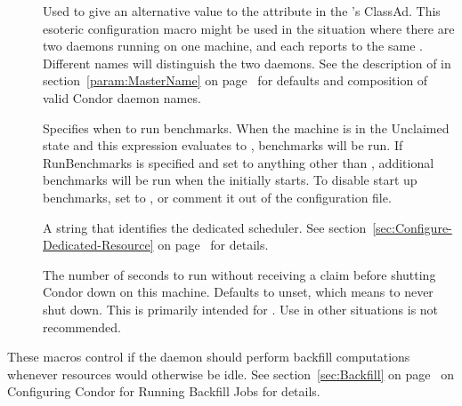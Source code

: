 \begin{description}
\item[] \label{param:StartdName}
  Used to give an alternative value to the  attribute
  in the 's ClassAd.
  This esoteric configuration macro might be used in the situation
  where there are two  daemons running on one machine,
  and each reports to the same .
  Different names will distinguish the two daemons.
  See the description of  in
  section~\ref{param:MasterName} on page~\pageref{param:MasterName}
  for defaults and composition of valid Condor daemon names.

\item[] \label{param:RunBenchmarks}
  Specifies when to run benchmarks.
  When the machine is in the Unclaimed state and this expression
  evaluates to , benchmarks will be run.
  If RunBenchmarks is specified and set to anything other than ,
  additional benchmarks will be run when the  initially starts.
  To disable start up benchmarks, set  to ,
  or comment it out of the configuration file.

\item[] \label{param:DedicatedScheduler}
  A string that identifies the dedicated scheduler.
  See section~\ref{sec:Configure-Dedicated-Resource}
  on page~\pageref{sec:Configure-Dedicated-Resource} for details.

\item[] \label{param:StartdNoclaimShutdown}
  The number of seconds to run without receiving a claim before
  shutting Condor down on this machine.  Defaults to unset, which
  means to never shut down.  This is primarily intended for .
  Use in other situations is not recommended.

\end{description}

These macros control if the  daemon should perform
backfill computations whenever resources would otherwise be idle.  
See section~\ref{sec:Backfill} on page~\pageref{sec:Backfill} on
Configuring Condor for Running Backfill Jobs for details.

